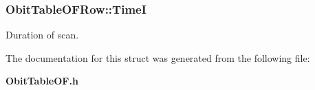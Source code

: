 \subsubsection{ {\bf Obit\-Table\-OFRow::Time\-I}}\label{structObitTableOFRow_o7}


Duration of scan. 



The documentation for this struct was generated from the following file:\begin{CompactItemize}
\item 
{\bf Obit\-Table\-OF.h}\end{CompactItemize}
